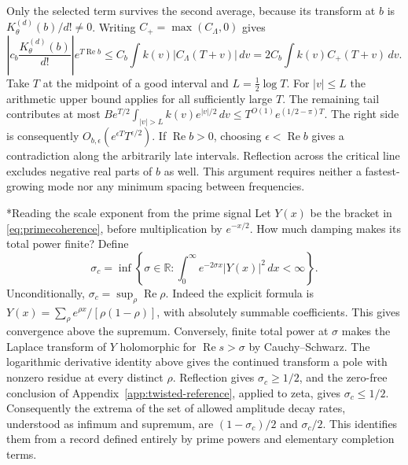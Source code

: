 \documentclass[11pt,letterpaper]{article}
\makeatletter
\renewcommand\subsection{\@startsection{subsection}{2}{\z@}{-2.0ex plus -.3ex}{.75ex}{\normalfont\normalsize\itshape}}
\numberwithin{equation}{section}
\makeatother
\begin{document}
Only the selected term survives the second average, because its transform at $b$ is $K_\theta^{(d)}(b)/d!\ne0$. Writing $C_+=\max(C_\Lambda,0)$ gives
\[
 \left|c_b\frac{K_\theta^{(d)}(b)}{d!}\right|e^{T\operatorname{Re}b}
 \le C_b\int k(v)|C_\Lambda(T+v)|\,dv
 =2C_b\int k(v)C_+(T+v)\,dv .
\]
Take $T$ at the midpoint of a good interval and $L=\tfrac12\log T$. For $|v|\le L$ the arithmetic upper bound applies for all sufficiently large $T$. The remaining tail contributes at most
$B e^{T/2}\int_{|v|>L}k(v)e^{|v|/2}\,dv
\le T^{O(1)}e^{(1/2-\pi)T}$.
The right side is consequently $O_{b,\epsilon}(e^{\epsilon T}T^{\epsilon/2})$. If $\operatorname{Re}b>0$, choosing $\epsilon<\operatorname{Re}b$ gives a contradiction along the arbitrarily late intervals. Reflection across the critical line excludes negative real parts of $b$ as well. This argument requires neither a fastest-growing mode nor any minimum spacing between frequencies.

\subsection*{Reading the scale exponent from the prime signal}\label{app:power-threshold}
Let $Y(x)$ be the bracket in \eqref{eq:primecoherence}, before multiplication by $e^{-x/2}$. How much damping makes its total power finite? Define
\[
 \sigma_c=\inf\left\{\sigma\in\mathbb R:\int_0^\infty e^{-2\sigma x}|Y(x)|^2\,dx<\infty\right\}.
\]
Unconditionally, $\sigma_c=\sup_\rho\operatorname{Re}\rho$. Indeed the explicit formula is $Y(x)=\sum_\rho e^{\rho x}/[\rho(1-\rho)]$, with absolutely summable coefficients. This gives convergence above the supremum. Conversely, finite total power at $\sigma$ makes the Laplace transform of $Y$ holomorphic for $\operatorname{Re}s>\sigma$ by Cauchy--Schwarz. The logarithmic derivative identity above gives the continued transform a pole with nonzero residue at every distinct $\rho$. Reflection gives $\sigma_c\ge1/2$, and the zero-free conclusion of Appendix~\ref{app:twisted-reference}, applied to zeta, gives $\sigma_c\le1/2$. Consequently the extrema of the set of allowed amplitude decay rates, understood as infimum and supremum, are $(1-\sigma_c)/2$ and $\sigma_c/2$. This identifies them from a record defined entirely by prime powers and elementary completion terms.
\end{document}
